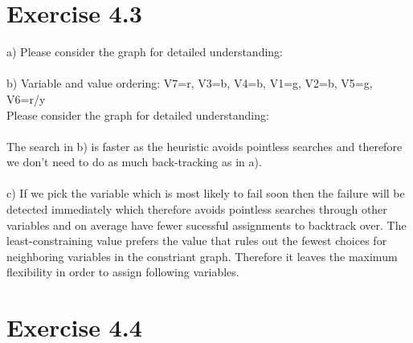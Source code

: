 \documentclass[12pt]{article}
\begin{document}
{\section*{Exercise 4.3}


a) Please consider the graph for detailed understanding:\\ \\
b) Variable and value ordering: V7=r, V3=b, V4=b, V1=g, V2=b, V5=g, V6=r/y\\
Please consider the graph for detailed understanding:\\ \\
The search in b) is faster as the heuristic avoids pointless searches and therefore we don't need to do as much back-tracking as in a).\\ \\
c) If we pick the variable which is most likely to fail soon then the failure will be detected immediately which therefore avoids pointless searches through other variables and on average have fewer sucessful assignments to backtrack over. The least-constraining value prefers the value that rules out the fewest choices for neighboring variables in the constriant graph. Therefore it leaves the maximum flexibility in order to assign following variables.\\

\section*{Exercise 4.4}


}
\end{document}
